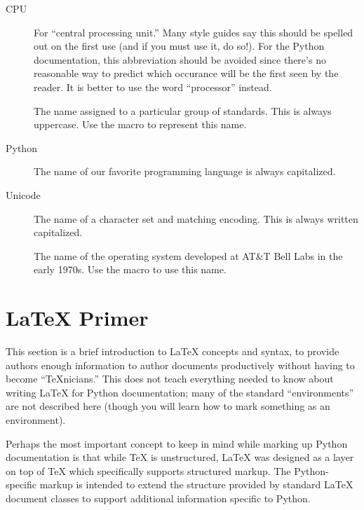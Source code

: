 \documentclass{howto}
\begin{document}
  \begin{description}
    \item[CPU]
    For ``central processing unit.''  Many style guides say this
    should be spelled out on the first use (and if you must use it,
    do so!).  For the Python documentation, this abbreviation should
    be avoided since there's no reasonable way to predict which occurance
    will be the first seen by the reader.  It is better to use the
    word ``processor'' instead.

    \item[\POSIX]
        The name assigned to a particular group of standards.  This is
        always uppercase.  Use the macro  to represent this
        name.

    \item[Python]
        The name of our favorite programming language is always
        capitalized.

    \item[Unicode]
        The name of a character set and matching encoding.  This is
        always written capitalized.

    \item[\UNIX]
        The name of the operating system developed at AT\&T Bell Labs
        in the early 1970s.  Use the macro  to use this
        name.
  \end{description}


\section{\LaTeX{} Primer \label{latex-primer}}

  This section is a brief introduction to \LaTeX{} concepts and
  syntax, to provide authors enough information to author documents
  productively without having to become ``\TeX{}nicians.''  This does
  not teach everything needed to know about writing \LaTeX{} for
  Python documentation; many of the standard ``environments'' are not
  described here (though you will learn how to mark something as an
  environment).

  Perhaps the most important concept to keep in mind while marking up
  Python documentation is that while \TeX{} is unstructured, \LaTeX{} was
  designed as a layer on top of \TeX{} which specifically supports
  structured markup.  The Python-specific markup is intended to extend
  the structure provided by standard \LaTeX{} document classes to
  support additional information specific to Python.
\end{document}
